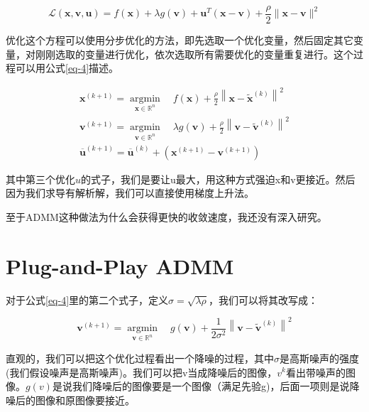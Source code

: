 \documentclass[10pt]{report}
\begin{document}
\begin{equation}
\mathcal{L}(\boldsymbol{x}, \boldsymbol{v}, \boldsymbol{u})=f(\boldsymbol{x})+\lambda g(\boldsymbol{v})+\boldsymbol{u}^{T}(\boldsymbol{x}-\boldsymbol{v})+\frac{\rho}{2}\|\boldsymbol{x}-\boldsymbol{v}\|^{2}
\label{eq-3}	
\end{equation}

优化这个方程可以使用分步优化的方法，即先选取一个优化变量，然后固定其它变量，对刚刚选取的变量进行优化，依次选取所有需要优化的变量重复进行。这个过程可以用公式\ref{eq-4}描述。

\begin{equation}
\begin{array}{l}
\boldsymbol{x}^{(k+1)}=\underset{\boldsymbol{x} \in \mathbb{R}^{n}}{\operatorname{argmin}} \quad f(\boldsymbol{x})+\frac{\rho}{2}\left\|\boldsymbol{x}-\tilde{\boldsymbol{x}}^{(k)}\right\|^{2} \\
\boldsymbol{v}^{(k+1)}=\underset{\boldsymbol{v} \in \mathbb{R}^{n}}{\operatorname{argmin}} \quad \lambda g(\boldsymbol{v})+\frac{\rho}{2}\left\|\boldsymbol{v}-\widetilde{\boldsymbol{v}}^{(k)}\right\|^{2} \\
\overline{\boldsymbol{u}}^{(k+1)}=\overline{\boldsymbol{u}}^{(k)}+\left(\boldsymbol{x}^{(k+1)}-\boldsymbol{v}^{(k+1)}\right)
\end{array}
\label{eq-4}
\end{equation}

其中第三个优化$u$的式子，我们是要让u最大，用这种方式强迫x和v更接近。然后因为我们求导有解析解，我们可以直接使用梯度上升法。

至于ADMM这种做法为什么会获得更快的收敛速度，我还没有深入研究。

\section{Plug-and-Play ADMM}

对于公式\ref{eq-4}里的第二个式子，定义$\sigma = \sqrt{\lambda \rho}$，我们可以将其改写成：

\begin{equation}
\boldsymbol{v}^{(k+1)}=\underset{\boldsymbol{v} \in \mathbb{R}^{n}}{\operatorname{argmin}} \quad g(\boldsymbol{v})+\frac{1}{2 \sigma^{2}}\left\|\boldsymbol{v}-\tilde{\boldsymbol{v}}^{(k)}\right\|^{2}
\label{admm-v}
\end{equation}

直观的，我们可以把这个优化过程看出一个降噪的过程，其中$\sigma$是高斯噪声的强度(我们假设噪声是高斯噪声)。我们可以把v当成降噪后的图像，$v^{k}$看出带噪声的图像。$g(v)$是说我们降噪后的图像要是一个图像（满足先验g)，后面一项则是说降噪后的图像和原图像要接近。
\end{document}
